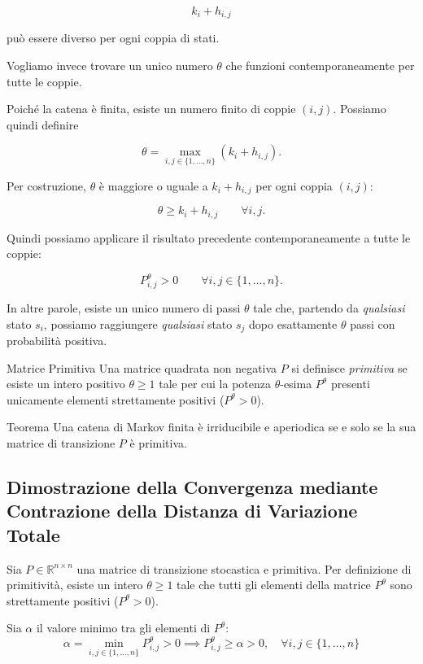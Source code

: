 $$
k_i+h_{i,j}
$$

può essere diverso per ogni coppia di stati.

Vogliamo invece trovare un unico numero $\theta$ che funzioni contemporaneamente per tutte le coppie.

Poiché la catena è finita, esiste un numero finito di coppie $(i,j)$. Possiamo quindi definire

$$
\boxed{
\theta=
\max_{i,j\in\{1,\ldots,n\}}
\left(k_i+h_{i,j}\right).
}
$$

Per costruzione, $\theta$ è maggiore o uguale a $k_i+h_{i,j}$ per ogni coppia $(i,j)$:

$$
\theta\geq k_i+h_{i,j}
\qquad
\forall i,j.
$$

Quindi possiamo applicare il risultato precedente contemporaneamente a tutte le coppie:

$$
\boxed{
P^\theta_{i,j}>0
\qquad
\forall i,j\in\{1,\ldots,n\}.
}
$$

In altre parole, esiste un unico numero di passi $\theta$ tale che, partendo da \emph{qualsiasi} stato $s_i$, possiamo raggiungere \emph{qualsiasi} stato $s_j$ dopo esattamente $\theta$ passi con probabilità positiva.




\begin{definition}{Matrice Primitiva}
    Una matrice quadrata non negativa $P$ si definisce \emph{primitiva} se esiste un intero positivo $\theta \ge 1$ tale per cui la potenza $\theta$-esima $P^\theta$ presenti unicamente elementi strettamente positivi ($P^\theta > 0$).
\end{definition}

\begin{theorem}{Teorema}
Una catena di Markov finita è irriducibile e aperiodica se e solo se la sua matrice di transizione $P$ è primitiva.    
\end{theorem}

\subsection{Dimostrazione della Convergenza mediante Contrazione della Distanza di Variazione Totale}

Sia $P \in \mathbb{R}^{n \times n}$ una matrice di transizione stocastica e primitiva. Per definizione di primitività, esiste un intero $\theta \ge 1$ tale che tutti gli elementi della matrice $P^\theta$ sono strettamente positivi ($P^\theta > 0$).

Sia $\alpha$ il valore minimo tra gli elementi di $P^\theta$:
\begin{equation}
\alpha = \min_{i,j \in \{1,\dots,n\}} P^\theta_{i,j} > 0 \implies P^\theta_{i,j} \ge \alpha > 0, \quad \forall i,j \in \{1,\dots,n\}
\end{equation}

